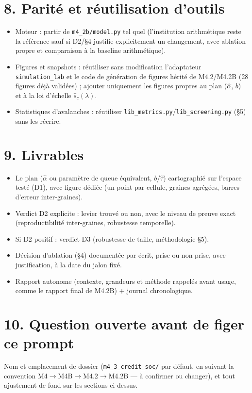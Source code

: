 \documentclass[11pt,a4paper]{article}
\newcommand{\code}[1]{\texttt{#1}}
\begin{document}
\section*{8. Parité et réutilisation d'outils}

\begin{itemize}
\item Moteur : partir de \code{m4\_2b/model.py} tel quel
  (l'institution arithmétique reste la référence sauf si D2/\S4
  justifie explicitement un changement, avec ablation propre et
  comparaison à la baseline arithmétique).
\item Figures et snapshots : réutiliser sans modification l'adaptateur
  \code{simulation\_lab} et le code de génération de figures hérité
  de M4.2/M4.2B (28 figures déjà validées) ; ajouter uniquement les
  figures propres au plan ($\hat\alpha$, $b$) et à la loi d'échelle
  $\hat s_c(\lambda)$.
\item Statistiques d'avalanches : réutiliser
  \code{lib\_metrics.py}/\code{lib\_screening.py} (\S5) sans les
  récrire.
\end{itemize}

\section*{9. Livrables}

\begin{itemize}
\item Le plan ($\hat\alpha$ ou paramètre de queue équivalent,
  $b$/$\hat\tau$) cartographié sur l'espace testé (D1), avec figure
  dédiée (un point par cellule, graines agrégées, barres d'erreur
  inter-graines).
\item Verdict D2 explicite : levier trouvé ou non, avec le niveau de
  preuve exact (reproductibilité inter-graines, robustesse
  temporelle).
\item Si D2 positif : verdict D3 (robustesse de taille, méthodologie
  \S5).
\item Décision d'ablation (\S4) documentée par écrit, prise ou non
  prise, avec justification, à la date du jalon fixé.
\item Rapport autonome (contexte, grandeurs et méthode rappelés avant
  usage, comme le rapport final de M4.2B) + journal chronologique.
\end{itemize}

\section*{10. Question ouverte avant de figer ce prompt}

Nom et emplacement de dossier (\code{m4\_3\_credit\_soc/} par défaut,
en suivant la convention M4$\to$M4B$\to$M4.2$\to$M4.2B --- à confirmer
ou changer), et tout ajustement de fond sur les sections ci-dessus.
\end{document}

